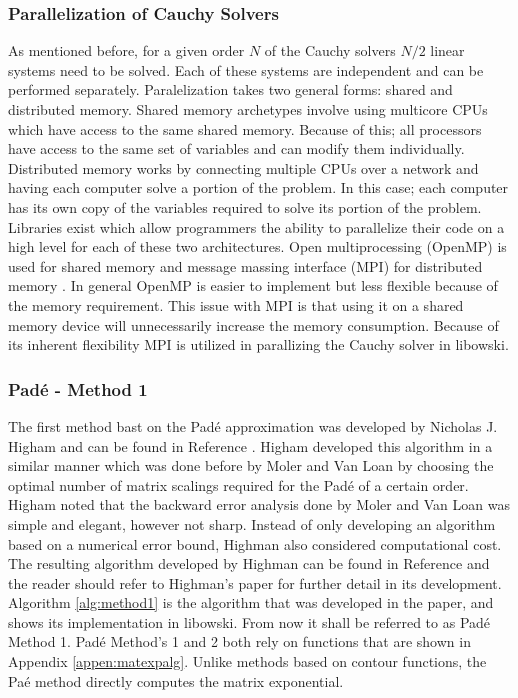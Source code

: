\subsubsection{Parallelization of Cauchy Solvers}
As mentioned before, for a given order $N$ of the Cauchy solvers $N/2$ linear systems need to be solved. Each of these systems are independent and can be performed separately. Paralelization takes two general forms: shared and distributed memory. Shared memory archetypes involve using multicore CPUs which have access to the same shared memory. Because of this; all processors have access to the same set of variables and can modify them individually. Distributed memory works by connecting multiple CPUs over a network and having each computer solve a portion of the problem. In this case; each computer has its own copy of the variables required to solve its portion of the problem. Libraries exist which allow programmers the ability to parallelize their code on a high level for each of these two architectures. Open multiprocessing (OpenMP) is used for shared memory and message massing interface (MPI) for distributed memory \cite{openmp} \cite{mpi}. In general OpenMP is easier to implement but less flexible because of the memory requirement. This issue with MPI is that using it on a shared memory device will unnecessarily increase the memory consumption. Because of its inherent flexibility MPI is utilized in parallizing the Cauchy solver in libowski. 

\subsubsection{Pad\'e - Method 1}
The first method bast on the Pad\'e approximation was developed by Nicholas J. Higham and can be found in Reference \cite{higham2005}. Higham developed this algorithm in a similar manner which was done before by Moler and Van Loan \cite{moler2003} by choosing the optimal number of matrix scalings required for the Pad\'e of a certain order. Higham noted that the backward error analysis done by Moler and Van Loan was simple and elegant, however not sharp. Instead of only developing an algorithm based on a numerical error bound, Highman also considered computational cost. The resulting algorithm developed by Highman can be found in Reference \cite{higham2005} and the reader should refer to Highman's paper for further detail in its development. Algorithm \ref{alg:method1} is the algorithm that was developed in the paper, and shows its implementation in libowski. From now it shall be referred to as Pad\'e Method 1. Pad\'e Method's 1 and 2 both rely on functions that are shown in Appendix \ref{appen:matexpalg}. Unlike methods based on contour functions, the Pa\'e method directly computes the matrix exponential. 

